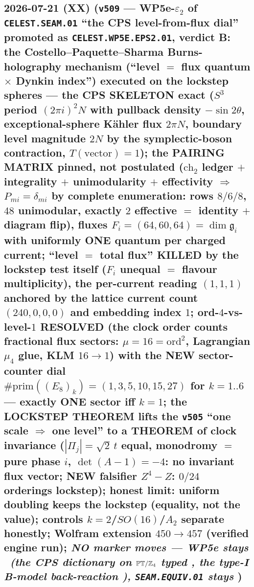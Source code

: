 \subsection*{2026-07-21 (XX) (\texttt{v509} --- WP5e-$\varepsilon_2$ of \texttt{CELEST.SEAM.01} ``the CPS level-from-flux dial'' promoted as \texttt{CELEST.WP5E.EPS2.01}, verdict B: the Costello--Paquette--Sharma Burns-holography mechanism (``level $=$ flux quantum $\times$ Dynkin index'') executed on the lockstep spheres --- the CPS SKELETON exact ($S^3$ period $(2\pi i)^2N$ with pullback density $-\sin2\theta$, exceptional-sphere K\"ahler flux $2\pi N$, boundary level magnitude $2N$ by the symplectic-boson contraction, $T(\text{vector})=1$); the PAIRING MATRIX pinned, not postulated ($\mathrm{ch}_2$ ledger $+$ integrality $+$ unimodularity $+$ effectivity $\Rightarrow$ $P_{mi}=\delta_{mi}$ by complete enumeration: rows $8/6/8$, $48$ unimodular, exactly $2$ effective $=$ identity $+$ diagram flip), fluxes $F_i=(64,60,64)=\dim\mathfrak g_i$ with uniformly ONE quantum per charged current; ``level $=$ total flux'' KILLED by the lockstep test itself ($F_i$ unequal $=$ flavour multiplicity), the per-current reading $(1,1,1)$ anchored by the lattice current count $(240,0,0,0)$ and embedding index $1$; ord-$4$-vs-level-$1$ RESOLVED (the clock order counts fractional flux sectors: $\mu=16=\mathrm{ord}^2$, Lagrangian $\mu_4$ glue, KLM $16\to1$) with the NEW sector-counter dial $\#\mathrm{prim}((E_8)_k)=(1,3,5,10,15,27)$ for $k=1..6$ --- exactly ONE sector iff $k=1$; the LOCKSTEP THEOREM lifts the \texttt{v505} ``one scale $\Rightarrow$ one level'' to a THEOREM of clock invariance ($|\Pi_j|=\sqrt2\,t$ equal, monodromy $=$ pure phase $i$, $\det(A{-}1)=-4$: no invariant flux vector; NEW falsifier $Z^4{-}Z$: $0/24$ orderings lockstep); honest limit: uniform doubling keeps the lockstep (equality, not the value); controls $k{=}2$/$SO(16)$/$A_2$ separate honestly; Wolfram extension $450\to457$ (verified engine run); \emph{NO marker moves --- WP5e stays \mO\ (the CPS dictionary on $\mathbb{PT}/\mathbb{Z}_4$ typed \mC, the type-I B-model back-reaction \mO), \texttt{SEAM.EQUIV.01} stays \mO})}
